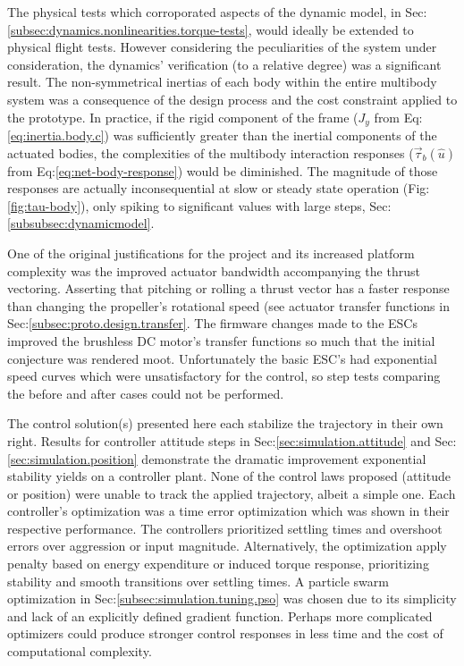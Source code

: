 The physical tests which corroporated aspects of the dynamic model, in Sec:\ref{subsec:dynamics.nonlinearities.torque-tests}, would ideally be extended to physical flight tests. However considering the peculiarities of the system under consideration, the dynamics' verification (to a relative degree) was a significant result. The non-symmetrical inertias of each body within the entire multibody system was a consequence of the design process and the cost constraint applied to the prototype. In practice, if the rigid component of the frame ($J_y$ from Eq:\ref{eq:inertia.body.c}) was sufficiently greater than the inertial components of the actuated bodies, the complexities of the multibody interaction responses ($\vec{\tau}_b(\hat{u})$ from Eq:\ref{eq:net-body-response}) would be diminished. The magnitude of those responses are actually inconsequential at slow or steady state operation (Fig:\ref{fig:tau-body}), only spiking to significant values with large steps, Sec:\ref{subsubsec:dynamicmodel}.
\par
One of the original justifications for the project and its increased platform complexity was the improved actuator bandwidth accompanying the thrust vectoring. Asserting that pitching or rolling a thrust vector has a faster response than changing the propeller's rotational speed (see actuator transfer functions in Sec:\ref{subsec:proto.design.transfer}. The firmware changes made to the ESCs improved the brushless DC motor's transfer functions so much that the initial conjecture was rendered moot. Unfortunately the basic ESC's had exponential speed curves which were unsatisfactory for the control, so step tests comparing the before and after cases could not be performed.
\par
The control solution(s) presented here each stabilize the trajectory in their own right. Results for controller attitude steps in Sec:\ref{sec:simulation.attitude} and Sec:\ref{sec:simulation.position} demonstrate the dramatic improvement exponential stability yields on a controller plant. None of the control laws proposed (attitude or position) were unable to track the applied trajectory, albeit a simple one. Each controller's optimization was a time error optimization which was shown in their respective performance. The controllers prioritized settling times and overshoot errors over aggression or input magnitude. Alternatively, the optimization apply penalty based on energy expenditure or induced torque response, prioritizing stability and smooth transitions over settling times. 
A particle swarm optimization in Sec:\ref{subsec:simulation.tuning.pso} was chosen due to its simplicity and lack of an explicitly defined gradient function. Perhaps more complicated optimizers could produce stronger control responses in less time and the cost of computational complexity.
